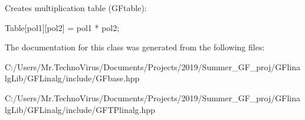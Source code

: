 Creates multiplication table (G\+Ftable)\+: \begin{DoxyVerb}Table[pol1][pol2] = pol1 * pol2;
\end{DoxyVerb}
 

The documentation for this class was generated from the following files\+:\begin{DoxyCompactItemize}
\item 
C\+:/\+Users/\+Mr.\+Techno\+Virus/\+Documents/\+Projects/2019/\+Summer\+\_\+\+G\+F\+\_\+proj/\+G\+Flinalg\+Lib/\+G\+F\+Linalg/include/G\+Fbase.\+hpp\item 
C\+:/\+Users/\+Mr.\+Techno\+Virus/\+Documents/\+Projects/2019/\+Summer\+\_\+\+G\+F\+\_\+proj/\+G\+Flinalg\+Lib/\+G\+F\+Linalg/include/G\+F\+T\+Plinalg.\+hpp\end{DoxyCompactItemize}
